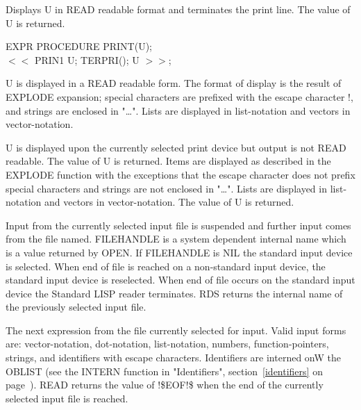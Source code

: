 \documentclass[11pt,letterpaper]{book}
\begin{document}
{Displays U in READ readable format and terminates the print line. The
value of U is returned.

{\tt \begin{tabbing} EXPR PROCEDURE PRINT(U); \\
\hspace*{2em} $<<$ PRIN1 U; TERPRI(); U $>>$;
\end{tabbing}}}


{U is displayed in a READ readable form. The format of display is the
result of EXPLODE expansion; special characters are prefixed with the
escape character !, and strings are enclosed in "\ldots ". Lists are
displayed in list-notation and vectors in vector-notation. }


{U is displayed upon the currently selected print device but output is
not READ readable. The value of U is returned. Items are displayed as
described in the EXPLODE function with the exceptions that the escape
character does not prefix special characters and strings are not
enclosed in "\ldots ". Lists are displayed in list-notation and
vectors in vector-notation. The value of U is returned. }


{Input from the currently selected input file is suspended and further
input comes from the file named. FILEHANDLE is a system dependent
internal name which is a value returned by OPEN. If FILEHANDLE is NIL
the standard input device is selected. When end of file is reached on
a non-standard input device, the standard input device is reselected.
When end of file occurs on the standard input device the Standard LISP
reader terminates. RDS returns the internal name of the previously
selected input file.

}


{The next expression from the file currently selected for input. Valid
input forms are: vector-notation, dot-notation, list-notation,
numbers, function-pointers, strings, and identifiers with escape
characters. Identifiers are interned onW the OBLIST (see
 
the INTERN function in "Identifiers", section~\ref{identifiers} on
page~\pageref{identifiers}). READ returns the
value of !\$EOF!\$ when the end of the currently selected input file
is reached. }
\end{document}
